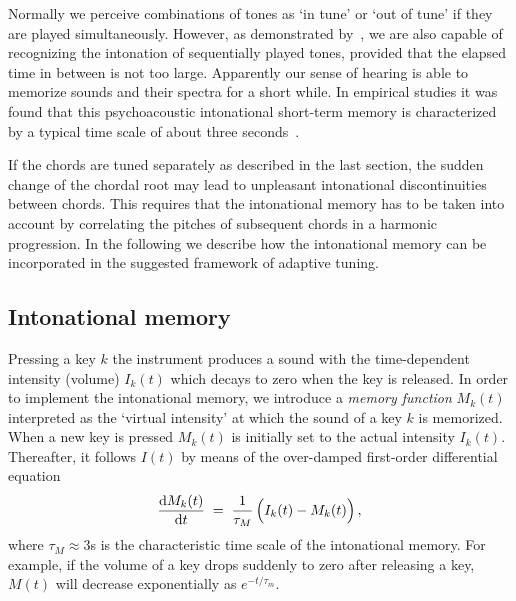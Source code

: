  
Normally we perceive combinations of tones as `in tune' or `out of tune' if they are played simultaneously. However, as demonstrated by~\cite{milne2016}, we are also capable of recognizing the intonation of sequentially played tones, provided that the elapsed time  in between is not too large. Apparently our sense of hearing is able to memorize sounds and their spectra for a short while. In empirical studies it was found that this psychoacoustic intonational short-term memory is characterized by a typical time scale of about three seconds~\cite{WittmannPoeppel,LehmannGoldhahn}. 

If the chords are tuned separately as described in the last section, the sudden change of the chordal root may lead to unpleasant intonational discontinuities between chords. This requires that the intonational memory has to be taken into account by correlating the pitches of subsequent chords in a harmonic progression. In the following we describe how the intonational memory can be incorporated in the suggested framework of adaptive tuning.

\subsection{Intonational memory}

Pressing a key $k$ the instrument produces a sound with the time-dependent intensity (volume) $I_k(t)$ which decays to zero when the key is released. In order to implement the intonational memory, we introduce a \textit{memory function} $M_k(t)$ interpreted as the `virtual intensity' at which the sound of a key $k$ is memorized. When a new key is pressed $M_k(t)$ is initially set to the actual intensity $I_k(t)$. Thereafter, it follows $I(t)$ by means of the over-damped first-order differential equation
%
\begin{equation}
\frac{{\rm d} M_k(t)}{{\rm d} t} \;=\; \frac{1}{\tau_M} \, \Bigl(I_k(t)-M_k(t)\Bigr)\,,
\end{equation}
%
where $\tau_M \approx 3$s is the characteristic time scale of the intonational memory. For example, if the volume of a key drops suddenly to zero after releasing a key, $M(t)$ will decrease exponentially as $e^{-t/\tau_m}$.

